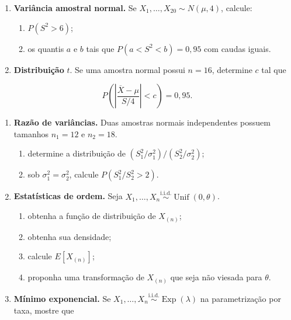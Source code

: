 \documentclass[
  letterpaper,
  DIV=11,
  numbers=noendperiod]{scrreprt}
\begin{document}
\begin{enumerate}
  \begin{enumerate}
  \def\labelenumii{\alph{enumii}.}
  \item
    \(P(Y\geq90)\);
  \item
    \(P(65\leq Y\leq85)\);
  \item
    compare os resultados com \texttt{pbinom()}.
  \end{enumerate}
\item
  \textbf{Variância amostral normal.} Se
  \(X_1,\ldots,X_{20}\sim N(\mu,4)\), calcule:

  \begin{enumerate}
  \def\labelenumii{\alph{enumii}.}
  \item
    \(P(S^2>6)\);
  \item
    os quantis \(a\) e \(b\) tais que \(P(a<S^2<b)=0{,}95\) com caudas
    iguais.
  \end{enumerate}
\item
  \textbf{Distribuição} \(t\). Se uma amostra normal possui \(n=16\),
  determine \(c\) tal que
\end{enumerate}

\[P\left(
\left|\frac{\overline{X}-\mu}{S/4}\right|<c
\right)=0{,}95.\]

\begin{enumerate}
\def\labelenumi{\arabic{enumi}.}
\setcounter{enumi}{13}
\item
  \textbf{Razão de variâncias.} Duas amostras normais independentes
  possuem tamanhos \(n_1=12\) e \(n_2=18\).

  \begin{enumerate}
  \def\labelenumii{\alph{enumii}.}
  \item
    determine a distribuição de
    \((S_1^2/\sigma_1^2)/(S_2^2/\sigma_2^2)\);
  \item
    sob \(\sigma_1^2=\sigma_2^2\), calcule \(P(S_1^2/S_2^2>2)\).
  \end{enumerate}
\item
  \textbf{Estatísticas de ordem.} Seja
  \(X_1,\ldots,X_n\overset{\mathrm{i.i.d.}}{\sim}\operatorname{Unif}(0,\theta)\).

  \begin{enumerate}
  \def\labelenumii{\alph{enumii}.}
  \item
    obtenha a função de distribuição de \(X_{(n)}\);
  \item
    obtenha sua densidade;
  \item
    calcule \(E[X_{(n)}]\);
  \item
    proponha uma transformação de \(X_{(n)}\) que seja não viesada para
    \(\theta\).
  \end{enumerate}
\item
  \textbf{Mínimo exponencial.} Se
  \(X_1,\ldots,X_n\overset{\mathrm{i.i.d.}}{\sim}\operatorname{Exp}(\lambda)\)
  na parametrização por taxa, mostre que
\end{enumerate}
\end{document}
